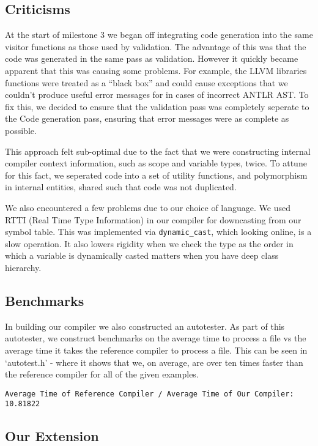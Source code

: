 \documentclass[a4wide, 11pt]{article}
\begin{document}
\subsection{Criticisms}

At the start of milestone 3 we began off integrating code generation into the same visitor functions as those used by validation. The advantage of this was that the code was generated in the same pass as validation. However it quickly became apparent that this was causing some problems. For example, the LLVM libraries functions were treated as a ``black box'' and could cause exceptions that we couldn't produce useful error messages for in cases of incorrect ANTLR AST. To fix this, we decided to ensure that the validation pass was completely seperate to the Code generation pass, ensuring that error messages were as complete as possible.

This approach felt sub-optimal due to the fact that we were constructing internal compiler context information, such as scope and variable types, twice. To attune for this fact, we seperated code into a set of utility functions, and polymorphism in internal entities, shared such that code was not duplicated.

We also encountered a few problems due to our choice of language. We used RTTI (Real Time Type Information) in our compiler for downcasting from our symbol table. This was implemented via \texttt{dynamic\_cast}, which looking online, is a slow operation. It also lowers rigidity when we check the type as the order in which a variable is dynamically casted matters when you have deep class hierarchy.

\subsection{Benchmarks}

In building our compiler we also constructed an autotester. As part of this autotester, we construct benchmarks on the average time to process a file vs the average time it takes the reference compiler to process a file. This can be seen in `autotest.h' - where it shows that we, on average, are over ten times faster than the reference compiler for all of the given examples.
\begin{verbatim}
Average Time of Reference Compiler / Average Time of Our Compiler: 10.81822
\end{verbatim}

\subsection{Our Extension}
\end{document}
